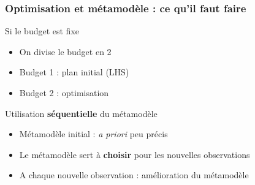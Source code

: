 \begin{frame}
\frametitle{Optimisation et métamodèle : ce qu'il faut faire}
\begin{block}{Si le budget est fixe}
 \begin{itemize}
  \item On divise le budget en 2
  \item Budget 1 : plan initial (LHS)
  \item Budget 2 : optimisation
 \end{itemize}
\end{block}

\begin{block}{Utilisation \textbf{séquentielle} du métamodèle}
 \begin{itemize}
  \item Métamodèle initial : \textit{a priori} peu précis
  \item Le métamodèle sert à \textbf{choisir} pour les nouvelles observations
  \item A chaque nouvelle observation : amélioration du métamodèle
 \end{itemize}
\end{block}
\end{frame}

% 
%    
%    
%    
%    
%   
%   

